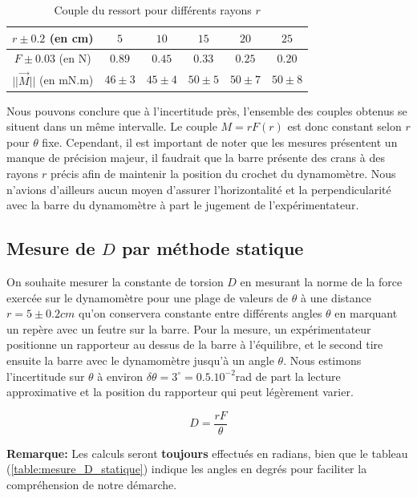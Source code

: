 \documentclass[12pt]{article}
\begin{document}
\begin{table}[h!]
	\centering
	\begin{tabular}{||c | c c c c c||} 
		\hline
		$r \pm 0.2$ (en cm) & $5$ & $10$ & $15$ & $20$ & $25$ \\
		\hline
        $F \pm 0.03$ (en N) & $0.89$ & $0.45$ & $0.33$ & $0.25$ & $0.20$ \\
		\hline
        $|| \vec{M} ||$ (en mN.m) & $46 \pm 3$ & $45 \pm 4$ & $50 \pm 5$ & $50 \pm 7$ & $50 \pm 8$ \\
        \hline
    \end{tabular}
	\caption{Couple du ressort pour différents rayons $r$}
	\label{table:couple_r_variable}
\end{table}

Nous pouvons conclure que à l'incertitude près, l'ensemble des couples obtenus se situent dans un même intervalle. Le couple $M = rF(r)$ 
est donc constant selon $r$ pour $\theta$ fixe. Cependant, il est important de noter que les mesures présentent un manque de précision majeur,
il faudrait que la barre présente des crans à des rayons $r$ précis afin de maintenir la position du crochet du dynamomètre. Nous n'avions d'ailleurs
aucun moyen d'assurer l'horizontalité et la perpendicularité avec la barre du dynamomètre à part le jugement de l'expérimentateur.

\subsection{Mesure de $D$ par méthode statique}
\label{D_statique}

On souhaite mesurer la constante de torsion $D$ en mesurant la norme de la force exercée sur le dynamomètre 
pour une plage de valeurs de $\theta$ à une distance $r=5 \pm 0.2cm$ qu'on conservera constante entre différents 
angles $\theta$ en marquant un repère avec un feutre sur la barre. Pour la mesure, un expérimentateur positionne un
rapporteur au dessus de la barre à l'équilibre, et le second tire ensuite la barre avec le dynamomètre jusqu'à un angle $\theta$. 
Nous estimons l'incertitude sur $\theta$ à environ $\delta \theta = 3^{\circ} = 0.5.10^{-2}$rad de part la lecture approximative et la position
du rapporteur qui peut légèrement varier.

\begin{equation}
    D = \frac{rF}{\theta}
\end{equation}

\textbf{Remarque:} Les calculs seront \textbf{toujours} effectués en radians, bien que le tableau (\ref{table:mesure_D_statique}) indique
les angles en degrés pour faciliter la compréhension de notre démarche.
\end{document}
